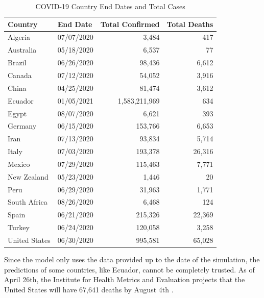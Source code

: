 \documentclass{homework}
\begin{document}
\begin{table}[H]
  \caption{COVID-19 Country End Dates and Total Cases}
  \label{Task 2 Results}
  \centering
  \begin{tabular}{llrr}
    \toprule
    Country       & End Date   & Total Confirmed & Total Deaths \\
    \midrule
    Algeria       & 07/07/2020 & 3,484           & 417          \\
    Australia     & 05/18/2020 & 6,537           & 77           \\
    Brazil        & 06/26/2020 & 98,436          & 6,612        \\
    Canada        & 07/12/2020 & 54,052          & 3,916        \\
    China         & 04/25/2020 & 81,474          & 3,612        \\
    Ecuador       & 01/05/2021 & 1,583,211,969   & 634          \\
    Egypt         & 08/07/2020 & 6,621           & 393          \\
    Germany       & 06/15/2020 & 153,766         & 6,653        \\
    Iran          & 07/13/2020 & 93,834          & 5,714        \\
    Italy         & 07/03/2020 & 193,378         & 26,316       \\
    Mexico        & 07/29/2020 & 115,463         & 7,771        \\
    New Zealand   & 05/23/2020 & 1,446           & 20           \\
    Peru          & 06/29/2020 & 31,963          & 1,771        \\
    South Africa  & 08/26/2020 & 6,468           & 124          \\
    Spain         & 06/21/2020 & 215,326         & 22,369       \\
    Turkey        & 06/24/2020 & 120,058         & 3,258        \\
    United States & 06/30/2020 & 995,581         & 65,028       \\
    \bottomrule
  \end{tabular}
\end{table}

Since the model only uses the data provided up to the date of the simulation, the predictions of some countries, like Ecuador, cannot be completely trusted. As of April 26th, the Institute for Health Metrics and Evaluation projects that the United States will have 67,641 deaths by August 4th \cite{ihme}.\\
\end{document}
